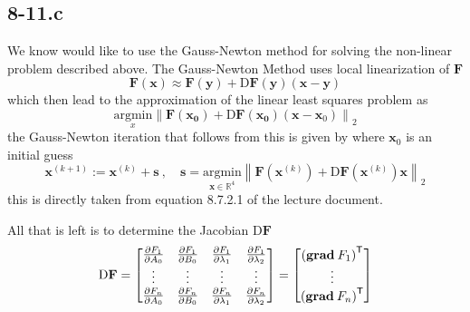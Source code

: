 \documentclass{article}
\begin{document}
\subsection*{8-11.c}
We know would like to use the Gauss-Newton method for solving the non-linear problem described above. The Gauss-Newton Method uses local linearization of $\mathbf{F}$
\begin{equation*}
    \mathbf{F}\left(\mathbf{x}\right) \approx \mathbf{F}\left(\mathbf{y}\right) + \mathrm{D}\mathbf{F}\left(\mathbf{y}\right)\left(\mathbf{x}-\mathbf{y}\right)
\end{equation*}
which then lead to the approximation of the linear least squares problem as
\begin{equation*}
    \underset{x}{\text{argmin}}\left\lVert \mathbf{F}\left(\mathbf{x_{0}}\right) + \mathrm{D}\mathbf{F}\left(\mathbf{x_{0}}\right)\left(\mathbf{x}-\mathbf{x}_{0}\right)\right\rVert_{2}
\end{equation*}
the Gauss-Newton iteration that follows from this is given by where $\mathbf{x}_{0}$ is an initial guess
\begin{equation*}
    \mathbf{x}^{\left(k+1\right)}:= \mathbf{x}^{\left(k\right)} + \mathbf{s} \:, \quad \mathbf{s} = \underset{\mathbf{x}\in \mathbb{R}^{4}}{\text{argmin}}\left\lVert  \mathbf{F}\left(\mathbf{x}^{\left(k\right)}\right) + \mathrm{D}\mathbf{F}\left(\mathbf{x}^{\left(k\right)}\right)\mathbf{x} \right\rVert_{2}
\end{equation*}
this is directly taken from equation 8.7.2.1 of the lecture document.

\pagebreak

\noindent All that is left is to determine the Jacobian $\mathrm{D}\mathbf{F}$
\begin{equation*}
   \mathrm{D}\mathbf{F} = \begin{bmatrix} \frac{\partial F_{1}}{\partial A_{0}} & \frac{\partial F_{1}}{\partial B_{0}} & \frac{\partial F_{1}}{\partial \lambda_{1}} & \frac{\partial F_{1}}{\partial \lambda_{2}} \\ 
   \vdots & \vdots & \vdots & \vdots \\
   \frac{\partial F_{n}}{\partial A_{0}} & \frac{\partial F_{n}}{\partial B_{0}} & \frac{\partial F_{n}}{\partial \lambda_{1}} & \frac{\partial F_{n}}{\partial \lambda_{2}}
   \end{bmatrix}  = 
   \begin{bmatrix}
       \left(\text{\textbf{grad}} \: F_{1}\right)^{\mathsf{T}} \\
       \vdots \\
       \left(\text{\textbf{grad}} \: F_{n}\right)^{\mathsf{T}}
   \end{bmatrix}
\end{equation*}
\end{document}
